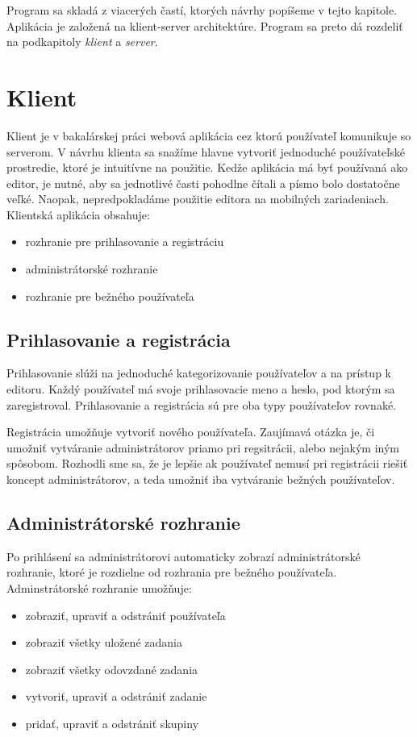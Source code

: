 Program sa skladá z viacerých častí, ktorých návrhy popíšeme v tejto kapitole.
Aplikácia je založená na klient-server architektúre. Program sa preto dá rozdeliť na 
podkapitoly \textit{klient} a \textit{server}.

\section{Klient}
Klient je v bakalárskej práci webová aplikácia cez ktorú používateľ komunikuje so serverom. V návrhu
klienta sa snažíme hlavne vytvoriť jednoduché používateľské prostredie, ktoré je intuitívne na
použitie. Kedže aplikácia má byť používaná ako editor, je nutné, aby sa jednotlivé časti pohodlne
čítali a písmo bolo dostatočne veľké. Naopak, nepredpokladáme použitie editora na mobilných
zariadeniach. Klientská aplikácia obsahuje:
\begin{itemize}
\item rozhranie pre prihlasovanie a registráciu
\item administrátorské rozhranie
\item rozhranie pre bežného používateľa
\end{itemize}

\subsection{Prihlasovanie a registrácia}
Prihlasovanie slúži na jednoduché kategorizovanie používateľov a na prístup k editoru. Každý
používateľ má svoje prihlasovacie meno a heslo, pod ktorým sa zaregistroval. Prihlasovanie a
registrácia sú pre oba typy používateľov rovnaké.

Registrácia umožňuje vytvoriť nového používateľa. Zaujímavá otázka je, či umožniť vytváranie
administrátorov priamo pri regsitrácii, alebo nejakým iným spôsobom. Rozhodli sme sa, že je lepšie
ak používateľ nemusí pri registrácii riešiť koncept administrátorov, a teda umožniť iba vytváranie
bežných používateľov. 

\subsection{Administrátorské rozhranie}
Po prihlásení sa administrátorovi automaticky zobrazí administrátorské rozhranie, ktoré je rozdielne
od rozhrania pre bežného používateľa. Adminstrátorské rozhranie umožňuje:
\begin{itemize}
\item zobraziť, upraviť a odstrániť používateľa
\item zobraziť všetky uložené zadania
\item zobraziť všetky odovzdané zadania
\item vytvoriť, upraviť a odstrániť zadanie
\item pridať, upraviť a odstrániť skupiny
\end{itemize}


